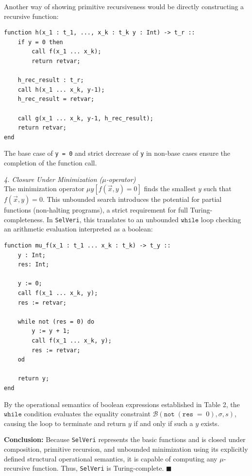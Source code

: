 \documentclass{article}
\begin{document}
Another way of showing primitive recursiveness would be directly constructing a recursive function:

\begin{verbatim}
function h(x_1 : t_1, ..., x_k : t_k y : Int) -> t_r ::
    if y = 0 then
        call f(x_1 ... x_k);
        return retvar;

    h_rec_result : t_r;
    call h(x_1 ... x_k, y-1);
    h_rec_result = retvar;
    
    call g(x_1 ... x_k, y-1, h_rec_result);
    return retvar;
end
\end{verbatim}

The base case of \texttt{y = 0} and strict decrease of \texttt{y} in non-base cases ensure the completion of the function call.


\newpage
\textit{4. Closure Under Minimization ($\mu$-operator)} \\
The minimization operator $\mu y [f(\vec{x}, y) = 0]$ finds the smallest $y$ such that $f(\vec{x}, y) = 0$. This unbounded search introduces the potential for partial functions (non-halting programs), a strict requirement for full Turing-completeness. In \texttt{SelVeri}, this translates to an unbounded $\mathtt{while}$ loop checking an arithmetic evaluation interpreted as a boolean:
\begin{verbatim}
function mu_f(x_1 : t_1 ... x_k : t_k) -> t_y ::
    y : Int;
    res: Int;
    
    y := 0;
    call f(x_1 ... x_k, y);
    res := retvar;
    
    while not (res = 0) do
        y := y + 1;
        call f(x_1 ... x_k, y);
        res := retvar;
    od
    
    return y;
end
\end{verbatim}
By the operational semantics of boolean expressions established in Table 2, the $\mathtt{while}$ condition evaluates the equality constraint $\mathcal{B}(\mathtt{not}\; (\mathtt{res} \;\mathtt{=}\; 0), \sigma, s)$, causing the loop to terminate and return $y$ if and only if such a $y$ exists.

\textbf{Conclusion:} Because \texttt{SelVeri} represents the basic functions and is closed under composition, primitive recursion, and unbounded minimization using its explicitly defined structural operational semantics, it is capable of computing any $\mu$-recursive function. Thus, \texttt{SelVeri} is Turing-complete. $\blacksquare$
\end{document}
